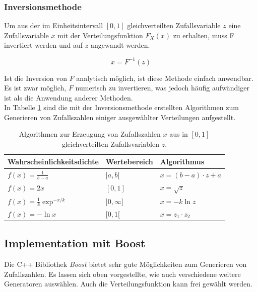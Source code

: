 \documentclass{book}
\begin{document}
\begin{refsection}
\subsubsection{Inversionsmethode}

Um aus der im Einheitsintervall $[0,1]$ gleichverteilten Zufallsvariable $z$  eine Zufallsvariable $x$ mit der Verteilungsfunktion $F_X(x)$ zu erhalten, muss F invertiert werden und auf $z$ angewandt werden.

\begin{equation}
	x = F^{-1}(z)
\end{equation}

Ist die Inversion von $F$ analytisch möglich, ist diese Methode einfach anwendbar. Es ist zwar möglich, $F$ numerisch zu invertieren, was jedoch häufig aufwändiger ist als die Anwendung anderer Methoden. \\

In Tabelle \ref{tab:verteilungen_erzeugen} sind die mit der Inversionsmethode erstellten Algorithmen zum Generieren von Zufallszahlen einiger ausgewählter Verteilungen aufgestellt.

\begin{table}[htbp]
	\centering
	\renewcommand{\arraystretch}{1.5}
	\begin{tabular}{|l|l|l|}
		\hline
		Wahrscheinlichkeitsdichte & Wertebereich & Algorithmus \\ \hline
		$f(x) = \frac{1}{b-a}$ & $[a,b[$ & $x = (b-a) \cdot z + a$ \\ \hline
		$f(x) = 2x$ & $[0,1]$ & $x = \sqrt{z}$ \\ \hline
		$f(x) = \frac{1}{k} \exp^{-x/k}$ & $]0,\infty]$ & $x = -k \ln z$ \\ \hline
		$f(x) = - \ln x$ & $[0,1[$ & $x = z_1 \cdot z_2$ \\ \hline
	\end{tabular}
	\caption{Algorithmen zur Erzeugung von Zufallszahlen $x$ aus in $[0,1]$ gleichverteilten Zufallsvariablen $z$.}
	\label{tab:verteilungen_erzeugen}
	\renewcommand{\arraystretch}{1.0}
\end{table}

\subsection{Implementation mit Boost}
Die C++ Bibliothek \textit{Boost} bietet sehr gute Möglichkeiten zum Generieren von Zufallszahlen. Es lassen sich oben vorgestellte, wie auch verschiedene weitere Generatoren auswählen. Auch die Verteilungsfunktion kann frei gewählt werden. \\


\end{refsection}
\end{document}

